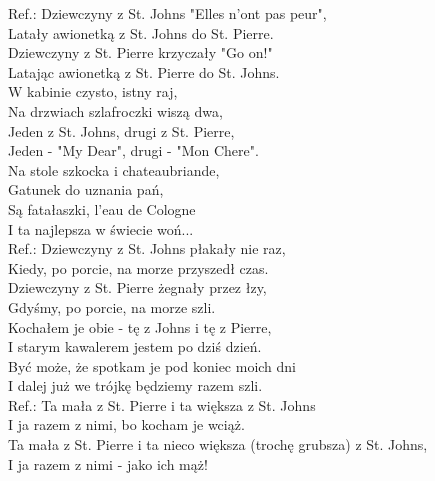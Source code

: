 Ref.: Dziewczyny z St. Johns "Elles n'ont pas peur", \\
Latały awionetką z St. Johns do St. Pierre. \\
Dziewczyny z St. Pierre krzyczały "Go on!" \\
Latając awionetką z St. Pierre do St. Johns. \\

W kabinie czysto, istny raj, \\
Na drzwiach szlafroczki wiszą dwa, \\
Jeden z St. Johns, drugi z St. Pierre, \\
Jeden - "My Dear", drugi - "Mon Chere". \\

Na stole szkocka i chateaubriande, \\
Gatunek do uznania pań, \\
Są fatałaszki, l'eau de Cologne \\
I ta najlepsza w świecie woń... \\

Ref.: Dziewczyny z St. Johns płakały nie raz, \\
Kiedy, po porcie, na morze przyszedł czas. \\
Dziewczyny z St. Pierre żegnały przez łzy, \\
Gdyśmy, po porcie, na morze szli. \\

Kochałem je obie - tę z Johns i tę z Pierre, \\
I starym kawalerem jestem po dziś dzień. \\
Być może, że spotkam je pod koniec moich dni \\
I dalej już we trójkę będziemy razem szli. \\

Ref.: Ta mała z St. Pierre i ta większa z St. Johns \\
I ja razem z nimi, bo kocham je wciąż. \\
Ta mała z St. Pierre i ta nieco większa (trochę grubsza) z St. Johns, \\
I ja razem z nimi - jako ich mąż!
